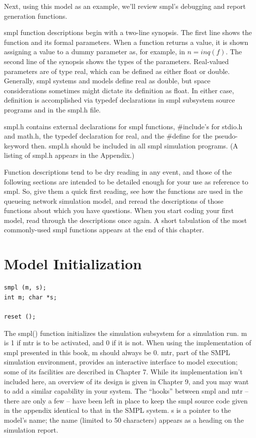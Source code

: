 Next, using this model as an example, we'll review smpl's debugging and report
generation functions.

smpl function descriptions begin with a two-line synopsis. The first line
shows the function and its formal parameters. When a function returns a value,
it is shown assigning a value to a dummy parameter as, for example, in
\ensuremath{n = inq(f)}. The second line of the synopsis shows the types of the
parameters. Real-valued parameters are of type real, which can be defined as
either float or double. Generally, smpl systems and models define real as
double, but space considerations sometimes might dictate its definition as
float. In either case, definition is accomplished via typedef declarations in
smpl subsystem source programs and in the smpl.h file.

smpl.h contains external declarations for smpl functions, \#include's for
stdio.h and math.h, the typedef declaration for real, and the \#define for the
pseudo-keyword then. smpl.h should be included in all smpl simulation
programs. (A listing of smpl.h appears in the Appendix.)

Function descriptions tend to be dry reading in any event, and those of the
following sections are intended to be detailed enough for your use as
reference to smpl. So, give them a quick first reading, see how the functions
are used in the queueing network simulation model, and reread the
descriptions of those functions about which you have questions. When you
start coding your first model, read through the descriptions once again. A
short tabulation of the most commonly-used smpl functions appears at the end
of this chapter.

\section{Model Initialization}
\label{sec:smpl-model-initialization}

\begin{verbatim}
smpl (m, s);
int m; char *s;

reset ();
\end{verbatim}

The smpl() function initializes the simulation subsystem for a simulation run.
m is 1 if mtr is to be activated, and 0 if it is not. When using the
implementation of smpl presented in this book, m should always be 0. mtr,
part of the SMPL simulation environment, provides an interactive interface to
model execution; some of its facilities are described in Chapter 7. While its
implementation isn't included here, an overview of its design is given in
Chapter 9, and you may want to add a similar capability in your system. The
``hooks'' between smpl and mtr -- there are only a few -- have been left in
place to keep the smpl source code given in the appendix identical to that in
the SMPL system. s is a pointer to the model's name; the name (limited to 50
characters) appears as a heading on the simulation report.


